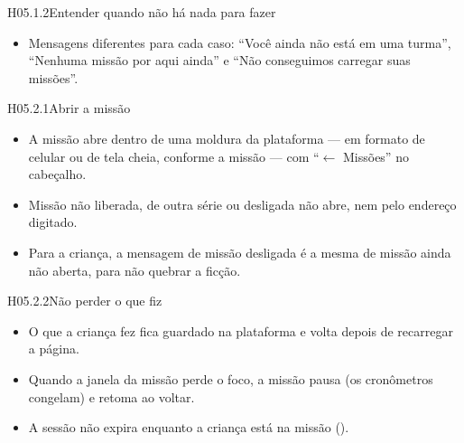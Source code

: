 \begin{historia}{H05.1.2}{Entender quando não há nada para fazer}{\pronto}
\aceite
\begin{itemize}
  \item Mensagens diferentes para cada caso: \enquote{Você ainda não está em
    uma turma}, \enquote{Nenhuma missão por aqui ainda} e \enquote{Não
    conseguimos carregar suas missões}.
\end{itemize}
\end{historia}


\begin{historia}{H05.2.1}{Abrir a missão}{\pronto}
\aceite
\begin{itemize}
  \item A missão abre dentro de uma moldura da plataforma --- em formato de
    celular ou de tela cheia, conforme a missão --- com \enquote{\ensuremath{\leftarrow}{}
    Missões} no cabeçalho.
  \item Missão não liberada, de outra série ou desligada não abre, nem pelo
    endereço digitado.
  \item Para a criança, a mensagem de missão desligada é a mesma de missão
    ainda não aberta, para não quebrar a ficção.
\end{itemize}
\end{historia}

\begin{historia}{H05.2.2}{Não perder o que fiz}{\pronto}
\aceite
\begin{itemize}
  \item O que a criança fez fica guardado na plataforma e volta depois de
    recarregar a página.
  \item Quando a janela da missão perde o foco, a missão pausa (os cronômetros
    congelam) e retoma ao voltar.
  \item A sessão não expira enquanto a criança está na missão ().
\end{itemize}
\end{historia}

